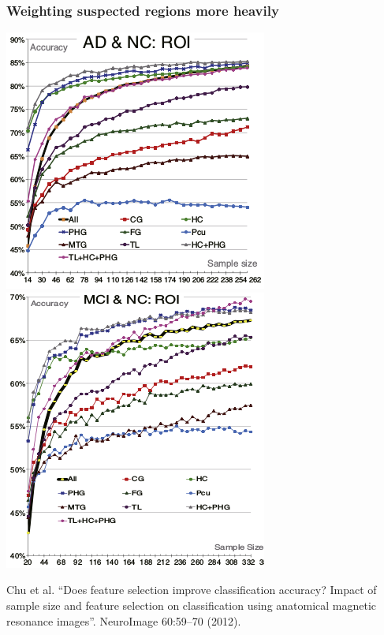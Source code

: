 \begin{frame}
\frametitle{Weighting suspected regions more heavily}
\begin{center}
\includegraphics[width=.45\textwidth]{prior_knowledge_AD_NC}
\includegraphics[width=.45\textwidth]{prior_knowledge_MCI_NC}\par
\begin{tiny}
Chu et al. ``Does feature selection improve classification accuracy? Impact of sample size and feature selection on classification using anatomical magnetic resonance images''.  NeuroImage 60:59--70 (2012).\par
\end{tiny}
\end{center}
\end{frame}


